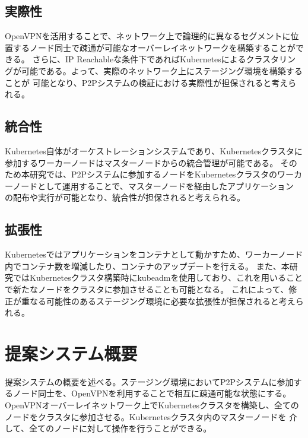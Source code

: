 \subsection{実際性}
OpenVPNを活用することで、ネットワーク上で論理的に異なるセグメントに位置するノード同士で疎通が可能なオーバーレイネットワークを構築することができる。
さらに、IP Reachableな条件下であればKubernetesによるクラスタリングが可能である。よって、実際のネットワーク上にステージング環境を構築することが
可能となり、P2Pシステムの検証における実際性が担保されると考えられる。

\subsection{統合性}
Kubernetes自体がオーケストレーションシステムであり、Kubernetesクラスタに参加するワーカーノードはマスターノードからの統合管理が可能である。
そのため本研究では、P2Pシステムに参加するノードをKubernetesクラスタのワーカーノードとして運用することで、マスターノードを経由したアプリケーション
の配布や実行が可能となり、統合性が担保されると考えられる。

\subsection{拡張性}
Kubernetesではアプリケーションをコンテナとして動かすため、ワーカーノード内でコンテナ数を増減したり、コンテナのアップデートを行える。
また、本研究ではKubernetesクラスタ構築時にkubeadmを使用しており、これを用いることで新たなノードをクラスタに参加させることも可能となる。
これによって、修正が重なる可能性のあるステージング環境に必要な拡張性が担保されると考えられる。

\section{提案システム概要}
\label{issue:about-system}
提案システムの概要を述べる。ステージング環境においてP2Pシステムに参加するノード同士を、OpenVPNを利用することで相互に疎通可能な状態にする。
OpenVPNオーバーレイネットワーク上でKubernetesクラスタを構築し、全てのノードをクラスタに参加させる。Kubernetesクラスタ内のマスターノードを
介して、全てのノードに対して操作を行うことができる。

